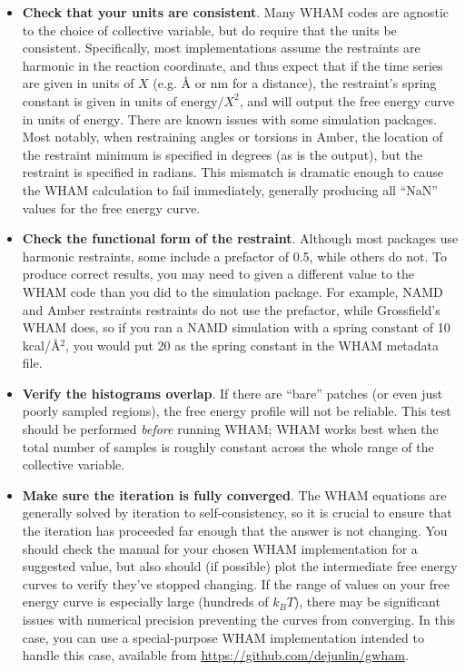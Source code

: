 \begin{itemize}

    \item \textbf{Check that your units are consistent}.  Many WHAM codes are
    agnostic to the choice of collective variable, but do require that the units
    be consistent.  Specifically, most implementations assume the restraints are
    harmonic in the reaction coordinate, and thus expect that if the time series
    are given in units of $X$ (e.g. {\AA} or nm for a distance), the restraint's
    spring constant is given in units of $\mathrm{energy}/X^2$, and will output
    the free energy curve in units of $\mathrm{energy}$.  There are known issues
    with some simulation packages. Most notably, when restraining angles or
    torsions in Amber, the location of the restraint minimum is specified in
    degrees (as is the output), but the restraint is specified in radians.  This
    mismatch is dramatic enough to cause the WHAM calculation to fail
    immediately, generally producing all ``NaN'' values for the free energy
    curve.

    \item \textbf{Check the functional form of the restraint}.  Although most
    packages use harmonic restraints, some include a prefactor of 0.5, while
    others do not.  To produce correct results, you may need to given a
    different value to the WHAM code than you did to the simulation package.
    For example, NAMD and Amber restraints restraints do not use the prefactor,
    while Grossfield's WHAM does, so if you ran a NAMD simulation with a spring
    constant of 10 kcal/{\AA}$^2$, you would put 20 as the spring constant in
    the WHAM metadata file.

    \item \textbf{Verify the histograms overlap}.  If there are ``bare'' patches
    (or even just poorly sampled regions), the free energy profile will not be
    reliable.  This test should be performed \emph{before} running WHAM; WHAM
    works best when the total number of samples is roughly constant across the
    whole range of the collective variable.

    \item \textbf{Make sure the iteration is fully converged}.  The WHAM
    equations are generally solved by iteration to self-consistency, so it is
    crucial to ensure that the iteration has proceeded far enough that the
    answer is not changing.  You should check the manual for your chosen WHAM
    implementation for a suggested value, but also should (if possible) plot the
    intermediate free energy curves to verify they've stopped changing.  If the
    range of values on your free energy curve is especially large (hundreds of
    $k_B T$), there may be significant issues with numerical precision
    preventing the curves from converging.  In this case, you can use a
    special-purpose WHAM implementation intended to handle this case, available
    from \url{https://github.com/dejunlin/gwham}.


\end{itemize}
